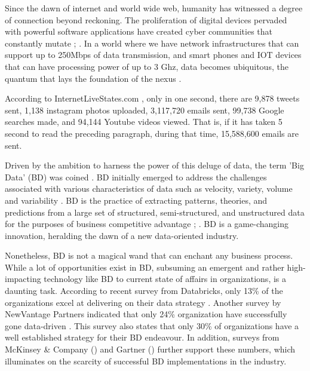 \documentclass[review]{elsarticle}
\begin{document}
Since the dawn of internet and world wide web, humanity has witnessed a degree of connection beyond reckoning. The proliferation of digital devices pervaded with powerful software applications have created cyber communities that constantly mutate \cite{AtaeiACIS}; \cite{AtaeiBigDataEnvirons}. In a world where we have network infrastructures that can support up to 250Mbps of data transmission, and smart phones and IOT devices that can have processing power of up to 3 Ghz, data becomes ubiquitous, the quantum that lays the foundation of the nexus \cite{AtaeiApsec}.

According to InternetLiveStates.com \cite{internet2019internet}, only in one second, there are 9,878 tweets sent, 1,138 instagram photos uploaded, 3,117,720 emails sent, 99,738 Google searches made, and 94,144 Youtube videos viewed. That is, if it has taken 5 second to read the preceding paragraph, during that time, 15,588,600 emails are sent.

Driven by the ambition to harness the power of this deluge of data, the term 'Big Data' (BD) was coined \cite{lycett2013datafication}. BD initially emerged to address the challenges associated with various characteristics of data such as velocity, variety, volume and variability \cite{AtaeiBigDataEnvirons}. BD is the practice of extracting patterns, theories, and predictions from a large set of structured, semi-structured, and unstructured data for the purposes of business competitive advantage \cite{AtaeiHype}; \cite{Huberty}. BD is a game-changing innovation, heralding the dawn of a new data-oriented industry.

Nonetheless, BD is not a magical wand that can enchant any business process. While a lot of opportunities exist in BD, subsuming an emergent and rather high-impacting technology like BD to current state of affairs in organizations, is a daunting task. According to recent survey from Databricks, only 13\% of the organizations excel at delivering on their data strategy \cite{DataBricksSurvey}. Another survey by NewVantage Partners indicated that only 24\% organization have successfully gone data-driven \cite{NewVantageSurvey}. This survey also states that only 30\% of organizations have a well established strategy for their BD endeavour. In addition, surveys from McKinsey \& Company (\cite{analytics2016age}) and Gartner (\cite{Nash}) further support these numbers, which illuminates on the scarcity of successful BD implementations in the industry.
\end{document}
